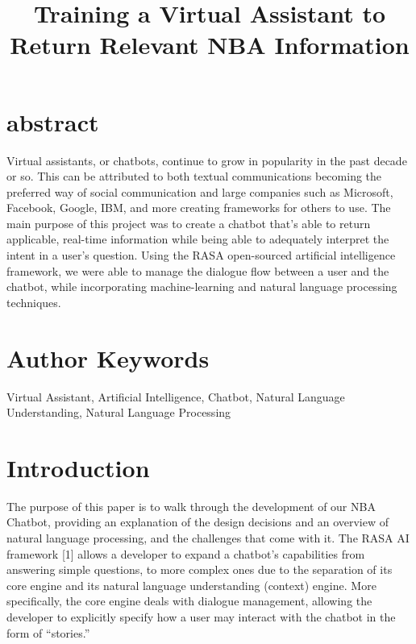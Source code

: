 \documentclass[conference]{IEEEtran}
\begin{document}
\title{Training a Virtual Assistant to Return Relevant NBA Information\\
}

\author{
\and
{}
}

\maketitle

\section*{abstract}
Virtual assistants, or chatbots, continue to grow in popularity in the past decade or so. This can be attributed to both textual communications becoming the preferred way of social communication and large companies such as Microsoft, Facebook, Google, IBM, and more creating frameworks for others to use. The main purpose of this project was to create a chatbot that’s able to return applicable, real-time information while being able to adequately interpret the intent in a user’s question. Using the RASA open-sourced artificial intelligence framework, we were able to manage the dialogue flow between a user and the chatbot, while incorporating machine-learning and natural language processing techniques.

\section*{Author Keywords}
Virtual Assistant, Artificial Intelligence, Chatbot, Natural Language Understanding, Natural Language Processing

\section*{Introduction}
The purpose of this paper is to walk through the development of our NBA Chatbot, providing an explanation of the design decisions and an overview of natural language processing, and the challenges that come with it. The RASA AI framework [1] allows a developer to expand a chatbot’s capabilities from answering simple questions, to more complex ones due to the separation of its core engine and its natural language understanding (context) engine. More specifically, the core engine deals with dialogue management, allowing the developer to explicitly specify how a user may interact with the chatbot in the form of “stories.” 
\end{document}

